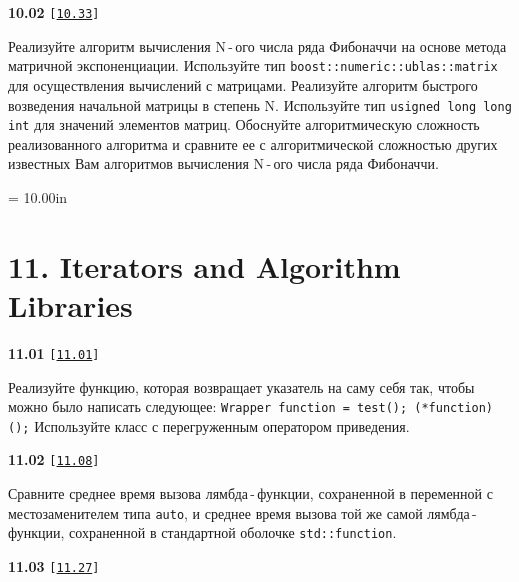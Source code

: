 \documentclass[a4paper,12pt]{article}
\begin{document}
\bigskip

{\large \textbf{10.02} \texttt{[\href{https://github.com/i-s-m-mipt/Education/blob/master/projects/examples/source/10.33.cpp}{\texttt{10.33}}]}}

\bigskip

Реализуйте алгоритм вычисления N\,-\,ого числа ряда Фибоначчи на основе метода матричной экспоненциации. Используйте тип \lstinline{boost::numeric::ublas::matrix} для осуществления вычислений с матрицами. Реализуйте алгоритм быстрого возведения начальной матрицы в степень N. Используйте тип \lstinline{usigned long long int} для значений элементов матриц. Обоснуйте алгоритмическую сложность реализованного алгоритма и сравните ее с алгоритмической сложностью других известных Вам алгоритмов вычисления N\,-\,ого числа ряда Фибоначчи.



\newpage\thispagestyle{empty}\pdfpageheight = 10.00in\enlargethispage{100in}

\section{11. Iterators and Algorithm Libraries}

{\large \textbf{11.01} \texttt{[\href{https://github.com/i-s-m-mipt/Education/blob/master/projects/examples/source/11.01.cpp}{\texttt{11.01}}]}}

\bigskip

Реализуйте функцию, которая возвращает указатель на саму себя так, чтобы можно было написать следующее: \lstinline{Wrapper function = test(); (*function)();} Используйте класс с перегруженным оператором приведения.

\bigskip

{\large \textbf{11.02} \texttt{[\href{https://github.com/i-s-m-mipt/Education/blob/master/projects/examples/source/11.08.cpp}{\texttt{11.08}}]}}

\bigskip

Сравните среднее время вызова лямбда\,-\,функции, сохраненной в переменной с местозаменителем типа \lstinline{auto}, и среднее время вызова той же самой лямбда\,-\,функции, сохраненной в стандартной оболочке \lstinline{std::function}.

\bigskip

{\large \textbf{11.03} \texttt{[\href{https://github.com/i-s-m-mipt/Education/blob/master/projects/examples/source/11.27.cpp}{\texttt{11.27}}]}}

\bigskip
\end{document}
